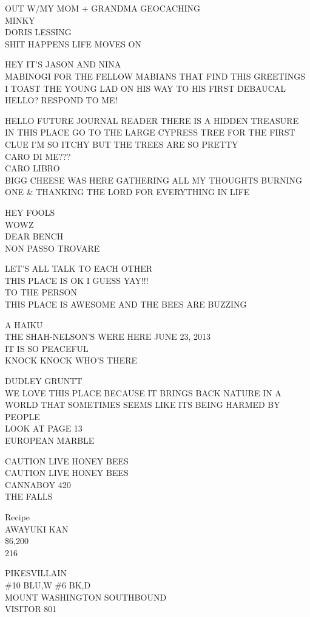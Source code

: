 \documentclass[10pt,letterpaper]{article}
\begin{document}
OUT W/MY MOM + GRANDMA GEOCACHING\\
MINKY\\
DORIS LESSING\\
SHIT HAPPENS LIFE MOVES ON

HEY IT'S JASON AND NINA\\
MABINOGI FOR THE FELLOW MABIANS THAT FIND THIS GREETINGS\\
I TOAST THE YOUNG LAD ON HIS WAY TO HIS FIRST DEBAUCAL\\
HELLO?  RESPOND TO ME!

HELLO FUTURE JOURNAL READER THERE IS A HIDDEN TREASURE IN THIS PLACE GO TO THE LARGE CYPRESS TREE FOR THE FIRST CLUE I'M SO ITCHY BUT THE TREES ARE SO PRETTY\\
CARO DI ME???\\
CARO LIBRO\\
BIGG CHEESE WAS HERE GATHERING ALL MY THOUGHTS BURNING ONE \& THANKING THE LORD FOR EVERYTHING IN LIFE

HEY FOOLS\\
WOWZ\\
DEAR BENCH\\
NON PASSO TROVARE

LET'S ALL TALK TO EACH OTHER\\
THIS PLACE IS OK I GUESS YAY!!!\\
TO THE PERSON\\
THIS PLACE IS AWESOME AND THE BEES ARE BUZZING

A HAIKU\\
THE SHAH{-}NELSON'S WERE HERE JUNE 23, 2013\\
IT IS SO PEACEFUL\\
KNOCK KNOCK WHO'S THERE

DUDLEY GRUNTT\\
WE LOVE THIS PLACE BECAUSE IT BRINGS BACK NATURE IN A WORLD THAT SOMETIMES SEEMS LIKE ITS BEING HARMED BY PEOPLE\\
LOOK AT PAGE 13\\
EUROPEAN MARBLE

CAUTION LIVE HONEY BEES\\
CAUTION LIVE HONEY BEES\\
CANNABOY 420\\
THE FALLS

Recipe\\
AWAYUKI KAN\\
\$6,200\\
216

PIKESVILLAIN\\
\#10 BLU,W \#6 BK,D\\
MOUNT WASHINGTON SOUTHBOUND\\
VISITOR 801
\end{document}
